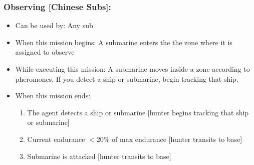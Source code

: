 \documentclass{article}
\begin{document}
    \subsubsection{Observing [Chinese Subs]:}
        \begin{itemize}
            \item{Can be used by:} Any sub
            \item{When this mission begins:} A submarine enters the the zone where it is assigned to observe
            \item{While executing this mission:} A submarine moves inside a zone according to pheromones. If you detect a ship or submarine, begin tracking that ship.
            \item{When this mission ends:} 
            \begin{enumerate}[label=\arabic*)]
            \item The agent detects a ship or submarine [hunter begins tracking that ship or submarine]
            \item Current endurance $<$20\% of max endurance [hunter transits to base]
            \item Submarine is attacked [hunter transits to base]
            \end{enumerate}
        \end{itemize}
\end{document}
